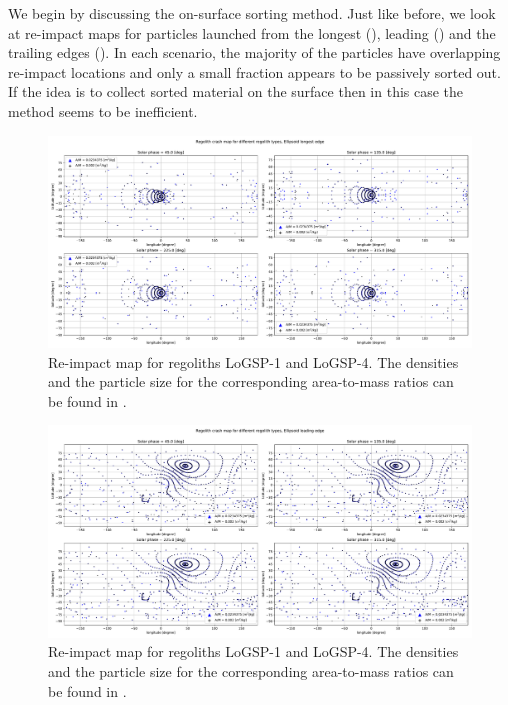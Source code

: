 %
\newline\newline
%
We begin by discussing the on-surface sorting method. Just like before, we look at re-impact maps for particles launched from the longest (), leading () and the trailing edges (). In each scenario, the majority of the particles have overlapping re-impact locations and only a small fraction appears to be passively sorted out. If the idea is to collect sorted material on the surface then in this case the method seems to be inefficient.
\begin{figure}[htb]
\centering
\captionsetup{justification=centering}
\includegraphics[angle=90, width=\textwidth, height=\textheight, keepaspectratio=true]{asteroid_mining/longestEdge_crashMap.pdf}
\caption{Re-impact map for regoliths LoGSP-1 and LoGSP-4. The densities and the particle size for the corresponding area-to-mass ratios can be found in .}
\label{fig:longestEdge_crashmap_sorting}
\end{figure}
\FloatBarrier
\begin{figure}[htb]
\centering
\captionsetup{justification=centering}
\includegraphics[angle=90, width=\textwidth, height=\textheight, keepaspectratio=true]{asteroid_mining/leadingEdge_crashMap.pdf}
\caption{Re-impact map for regoliths LoGSP-1 and LoGSP-4. The densities and the particle size for the corresponding area-to-mass ratios can be found in .}
\label{fig:leadingEdge_crashmap_sorting}
\end{figure}
